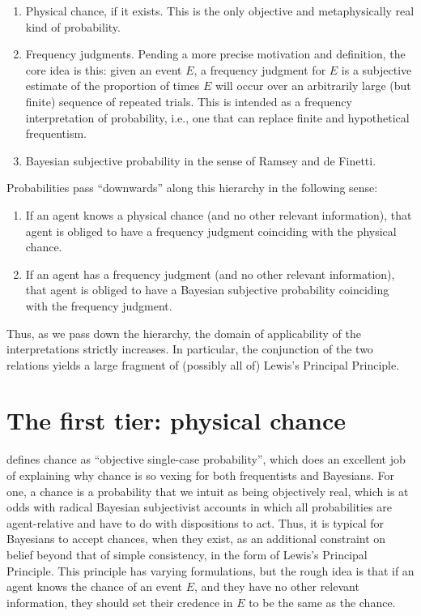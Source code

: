 \documentclass[letterpaper,12pt]{article}
\begin{document}
\begin{enumerate}
\item
Physical chance, if it exists. This is the only objective and metaphysically real kind of probability.
\item
Frequency judgments. Pending a more precise motivation and definition, the core idea is this: given an event $E$, a frequency judgment for $E$ is a subjective estimate of the proportion of times $E$ will occur over an arbitrarily large (but finite) sequence of repeated trials. This is intended as a frequency interpretation of probability, i.e., one that can replace finite and hypothetical frequentism.
\item
Bayesian subjective probability in the sense of Ramsey and de Finetti.
\end{enumerate}

Probabilities pass ``downwards'' along this hierarchy in the following sense:

\begin{enumerate}
\item
If an agent knows a physical chance (and no other relevant information), that agent is obliged to have a frequency judgment coinciding with the physical chance.
\item
If an agent has a frequency judgment (and no other relevant information), that agent is obliged to have a Bayesian subjective probability coinciding with the frequency judgment.
\end{enumerate}

Thus, as we pass down the hierarchy, the domain of applicability of the interpretations strictly increases. In particular, the conjunction of the two relations yields a large fragment of (possibly all of) Lewis's Principal Principle.

\section{The first tier: physical chance}
\cite{Lewis1994-LEWHSD} defines chance as ``objective single-case probability'', which does an excellent job of explaining why chance is so vexing for both frequentists and Bayesians. For one, a chance is a probability that we intuit as being objectively real, which is at odds with radical Bayesian subjectivist accounts in which all probabilities are agent-relative and have to do with dispositions to act. Thus, it is typical for Bayesians to accept chances, when they exist, as an additional constraint on belief beyond that of simple consistency, in the form of Lewis's Principal Principle. This principle has varying formulations, but the rough idea is that if an agent knows the chance of an event $E$, and they have no other relevant information, they should set their credence in $E$ to be the same as the chance.
\end{document}
